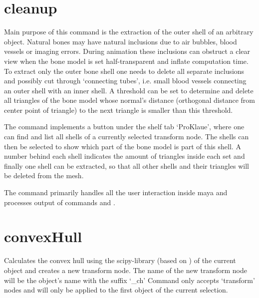 \documentclass[letterpaper,10pt,english]{sphinxmanual}
\begin{document}
\section{cleanup}
\label{\detokenize{pk_src.cleanup:cleanup}}\label{\detokenize{pk_src.cleanup::doc}}\label{\detokenize{pk_src.cleanup:id1}}
{\hyperref[\detokenize{index:commands}]{}}
\label{\detokenize{pk_src.cleanup:module-pk_src.cleanup}}
Main purpose of this command is the extraction of the outer shell of an arbitrary object. Natural bones may have
natural inclusions due to air bubbles, blood vessels or imaging errors. During animation these inclusions can obstruct a clear view when the bone model is set half-transparent and inflate computation time. To extract only the outer bone shell one needs to delete all separate inclusions and possibly cut through ‘connecting tubes’, i.e. small blood vessels connecting an outer shell with an inner shell. A threshold can be set to determine and delete all triangles of the bone model whose normal’s distance (orthogonal distance from center point of triangle) to the next triangle is smaller than this threshold.

The command implements a button  under the shelf tab ‘ProKlaue’, where one can find and list all shells of a currently selected transform node. The shells can then be selected to show which part of the bone model is part of this shell. A number behind each shell indicates the amount of triangles inside each set and finally one shell can be extracted, so that all other shells and their triangles will be deleted from the mesh.

The command primarily handles all the user interaction inside maya and processes output of commands {\hyperref[\detokenize{pk_src.getShells:getshells}]{}} and {\hyperref[\detokenize{pk_src.findTubeFaces:findtubefaces}]{}}.



\section{convexHull}
\label{\detokenize{pk_src.convexHull::doc}}\label{\detokenize{pk_src.convexHull:convexhull}}\label{\detokenize{pk_src.convexHull:id1}}
{\hyperref[\detokenize{index:commands}]{}}
\label{\detokenize{pk_src.convexHull:module-pk_src.convexHull}}
Calculates the convex hull using the scipy-library (based on ) of the current object and creates a new transform node. The name of the new transform node will be the object’s name with the suffix ‘\_ch’
Command only accepts ‘transform’ nodes and will only be applied to the first object of the current selection.
\end{document}
